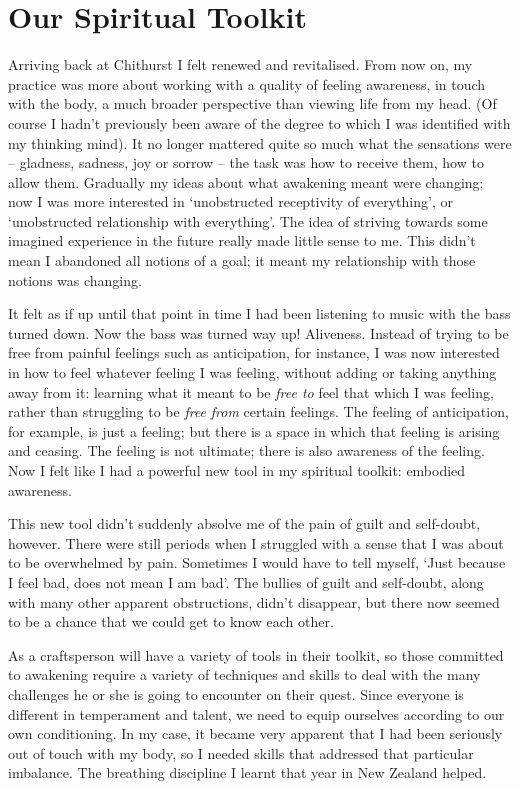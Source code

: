 \chapter{Our Spiritual Toolkit}

Arriving back at Chithurst I felt renewed and revitalised. From now on,
my practice was more about working with a quality of feeling awareness,
in touch with the body, a much broader perspective than viewing life
from my head. (Of course I hadn't previously been aware of the degree to
which I was identified with my thinking mind). It no longer mattered
quite so much what the sensations were -- gladness, sadness, joy or
sorrow -- the task was how to receive them, how to allow them. Gradually
my ideas about what awakening meant were changing; now I was more
interested in `unobstructed receptivity of everything', or `unobstructed
relationship with everything'. The idea of striving towards some
imagined experience in the future really made little sense to me. This
didn't mean I abandoned all notions of a goal; it meant my relationship
with those notions was changing.

It felt as if up until that point in time I had been listening to music
with the bass turned down. Now the bass was turned way up! Aliveness.
Instead of trying to be free from painful feelings such as anticipation,
for instance, I was now interested in how to feel whatever feeling I was
feeling, without adding or taking anything away from it: learning what
it meant to be \emph{free to} feel that which I was feeling, rather than
struggling to be \emph{free} \emph{from} certain feelings. The feeling
of anticipation, for example, is just a feeling; but there is a space in which that
feeling is arising and ceasing. The feeling is not ultimate; there is
also awareness of the feeling. Now I felt like I had a powerful new tool
in my spiritual toolkit: embodied awareness.

This new tool didn't suddenly absolve me of the pain of guilt and
self-doubt, however. There were still periods when I struggled with a
sense that I was about to be overwhelmed by pain. Sometimes I would have
to tell myself, `Just because I feel bad, does not mean I am bad'. The
bullies of guilt and self-doubt, along with many other apparent
obstructions, didn't disappear, but there now seemed to be a chance that
we could get to know each other.

As a craftsperson will have a variety of tools in their toolkit, so
those committed to awakening require a variety of techniques and skills
to deal with the many challenges he or she is going to encounter on
their quest. Since everyone is different in temperament and talent, we
need to equip ourselves according to our own conditioning. In my case,
it became very apparent that I had been seriously out of touch with my
body, so I needed skills that addressed that particular imbalance. The
breathing discipline I learnt that year in New Zealand helped.

